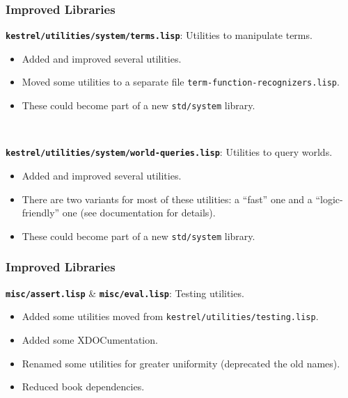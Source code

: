 \documentclass{beamer}
\newcommand{\code}[1]{\texttt{#1}}
\newcommand{\bookpath}[1]{\textbf{\code{#1}}}
\newcommand{\implibtitle}{\frametitle{Improved Libraries}}
\begin{document}
\begin{frame}

\implibtitle

\bookpath{kestrel/utilities/system/terms.lisp}:
Utilities to manipulate terms.
\begin{itemize}
\item
Added and improved several utilities.
\item
Moved some utilities to a separate file
\code{term-function-recognizers.lisp}.
\item
These could become part of a new \code{std/system} library.
\end{itemize}

\

\bookpath{kestrel/utilities/system/world-queries.lisp}:
Utilities to query worlds.
\begin{itemize}
\item
Added and improved several utilities.
\item
There are two variants for most of these utilities:
a ``fast'' one and a ``logic-friendly'' one
(see documentation for details).
\item
These could become part of a new \code{std/system} library.
\end{itemize}

\end{frame}


\begin{frame}

\implibtitle

\bookpath{misc/assert.lisp} \& \bookpath{misc/eval.lisp}:
Testing utilities.
\begin{itemize}
\item
Added some utilities moved from \code{kestrel/utilities/testing.lisp}.
\item
Added some XDOCumentation.
\item
Renamed some utilities for greater uniformity
(deprecated the old names).
\item
Reduced book dependencies.
\end{itemize}

\end{frame}

\end{document}
